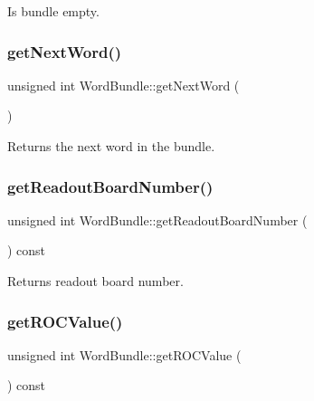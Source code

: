 Is bundle empty. 

\mbox{\label{class_word_bundle_a950e328fdf8b00e59b2d68da5182763f}} 
\subsubsection{\texorpdfstring{get\+Next\+Word()}{getNextWord()}}
{\footnotesize\ttfamily unsigned int Word\+Bundle\+::get\+Next\+Word (\begin{DoxyParamCaption}{ }\end{DoxyParamCaption})\hspace{0.3cm}{\ttfamily [inline]}}



Returns the next word in the bundle. 

\mbox{\label{class_word_bundle_a6d781e8e2bf5b1c0b67346bd6fd44ff9}} 
\subsubsection{\texorpdfstring{get\+Readout\+Board\+Number()}{getReadoutBoardNumber()}}
{\footnotesize\ttfamily unsigned int Word\+Bundle\+::get\+Readout\+Board\+Number (\begin{DoxyParamCaption}{ }\end{DoxyParamCaption}) const\hspace{0.3cm}{\ttfamily [inline]}}



Returns readout board number. 

\mbox{\label{class_word_bundle_ad2c91f230ac93d19900eba6b2c64d0e9}} 
\subsubsection{\texorpdfstring{get\+R\+O\+C\+Value()}{getROCValue()}}
{\footnotesize\ttfamily unsigned int Word\+Bundle\+::get\+R\+O\+C\+Value (\begin{DoxyParamCaption}{ }\end{DoxyParamCaption}) const\hspace{0.3cm}{\ttfamily [inline]}}



